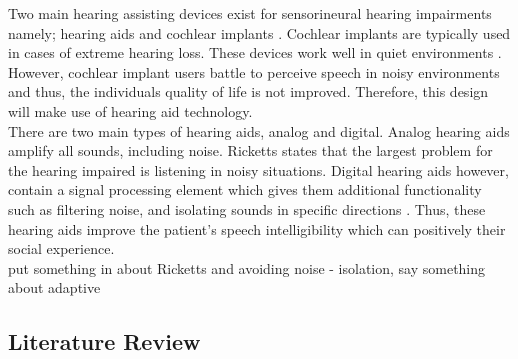 \documentclass[11pt,onecolumn]{witseiepaper}
\begin{document}
\noindent Two main hearing assisting devices exist for sensorineural hearing impairments namely; hearing aids and cochlear implants \cite{atlantic}. Cochlear implants are typically used in cases of extreme hearing loss. These devices work well in quiet environments \cite{carroll}. However, cochlear implant users battle to perceive speech in noisy environments \cite{carroll} and thus, the individuals quality of life is not improved. Therefore, this design will make use of hearing aid technology.\\
\newline
\noindent There are two main types of hearing aids, analog and digital. Analog hearing aids amplify all sounds, including noise\cite{woodford}. Ricketts \cite{ricketts} states that the largest problem for the hearing impaired is listening in noisy situations. Digital hearing aids however, contain a signal processing element which gives them additional functionality such as filtering noise, and isolating sounds in specific directions \cite{ricketts}. Thus, these hearing aids improve the patient's speech intelligibility which can positively their social experience.\\

put something in about Ricketts and avoiding noise - isolation, say something about adaptive

\subsection{Literature Review}
\label{sec:litReview}
\end{document}
